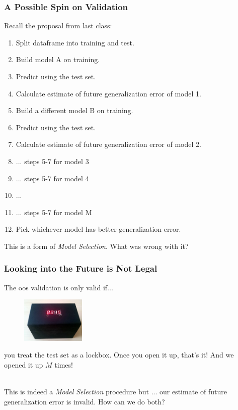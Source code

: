 \documentclass[handout]{beamer}
\begin{document}
\begin{frame}\frametitle{A Possible Spin on Validation}
\small

Recall the proposal from last class:
	
\begin{enumerate}\footnotesize
\item Split dataframe into training and test.
\item Build model A on training.
\item Predict using the test set. 
\item Calculate estimate of future generalization error of model 1.
\item Build a different model B on training.
\item Predict using the test set. 
\item Calculate estimate of future generalization error of model 2.
\item ... steps 5-7 for model 3
\item ... steps 5-7 for model 4
\item ...
\item ... steps 5-7 for model M
\item Pick whichever model has better generalization error.
\end{enumerate}

This is a form of \emph{Model Selection}. What was wrong with it?

\end{frame}

\begin{frame}\frametitle{Looking into the Future is Not Legal}

The oos validation is only valid if...

\begin{figure}
\centering
\includegraphics[width=1.2in]{lockbox.png}
\end{figure}

you treat the test set as a lockbox. Once you open it up, that's it! And we opened it up $M$ times!\\~\\ \pause

This is indeed a \emph{Model Selection} procedure but ... \pause our estimate of future generalization error is invalid. How can we do both?
	
\end{frame}
\end{document}
